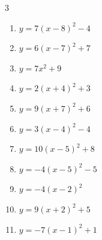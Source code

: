 \begin{multicols}{3}
\begin{enumerate}
  \item $\displaystyle y=7\left( x-8\right)^{2}-4$

        \phantom{$\displaystyle 頂点\left( 8 , -4 \right)$}

  \item $\displaystyle y=6\left( x-7\right)^{2}+7$

        \phantom{$\displaystyle 頂点\left( 7 , 7 \right)$}

  \item $\displaystyle y=7x^{2}+9$

        \phantom{$\displaystyle 頂点\left( 0 , 9 \right)$}

  \item $\displaystyle y=2\left( x+4\right)^{2}+3$

        \phantom{$\displaystyle 頂点\left( -4 , 3 \right)$}

  \item $\displaystyle y=9\left( x+7\right)^{2}+6$

        \phantom{$\displaystyle 頂点\left( -7 , 6 \right)$}

  \item $\displaystyle y=3\left( x-4\right)^{2}-4$

        \phantom{$\displaystyle 頂点\left( 4 , -4 \right)$}

  \item $\displaystyle y=10\left( x-5\right)^{2}+8$

        \phantom{$\displaystyle 頂点\left( 5 , 8 \right)$}

\columnbreak %

  \item $\displaystyle y=-4\left( x-5\right)^{2}-5$

        \phantom{$\displaystyle 頂点\left( 5 , -5 \right)$}

  \item $\displaystyle y=-4\left( x-2\right)^{2}$

        \phantom{$\displaystyle 頂点\left( 2 , 0 \right)$}

  \item $\displaystyle y=9\left( x+2\right)^{2}+5$

        \phantom{$\displaystyle 頂点\left( -2 , 5 \right)$}

  \item $\displaystyle y=-7\left( x-1\right)^{2}+1$

        \phantom{$\displaystyle 頂点\left( 1 , 1 \right)$}


\end{enumerate}
\end{multicols}
